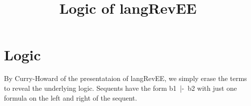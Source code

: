 \documentclass{article}
\begin{document}
\title{ Logic of {{langRevEE}} } 
\maketitle

\begin{abstract}
\end{abstract}


\section{Logic} 

By Curry-Howard of the presentataion of {{langRevEE}}, we simply erase
the terms to reveal the underlying logic. Sequents have the form
{{b1~|-~b2}} with just one formula on the left and right of the sequent. 


%
%
%
%
%
%
%


%
%
%





\begin{scriptsize}
 
  
\end{scriptsize}
\end{document}
